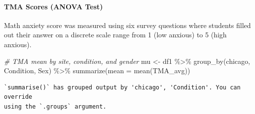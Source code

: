 \documentclass[
  letterpaper,
  DIV=11,
  numbers=noendperiod]{scrartcl}
\let\oldparagraph\paragraph
\renewcommand{\paragraph}[1]{\oldparagraph{#1}\mbox{}}
\newenvironment{Shaded}{\begin{snugshade}}{\end{snugshade}}
\newcommand{\AttributeTok}[1]{\textcolor[rgb]{0.49,0.56,0.16}{#1}}
\newcommand{\CommentTok}[1]{\textcolor[rgb]{0.38,0.63,0.69}{\textit{#1}}}
\newcommand{\FunctionTok}[1]{\textcolor[rgb]{0.02,0.16,0.49}{#1}}
\newcommand{\NormalTok}[1]{\textcolor[rgb]{0.00,0.44,0.13}{#1}}
\newcommand{\OtherTok}[1]{\textcolor[rgb]{0.00,0.44,0.13}{#1}}
\newcommand{\SpecialCharTok}[1]{\textcolor[rgb]{0.25,0.44,0.63}{#1}}
\begin{document}
\hypertarget{tma-scores-anova-test}{%
\paragraph{TMA Scores (ANOVA Test)}\label{tma-scores-anova-test}}

Math anxiety score was measured using six survey questions where
students filled out their answer on a discrete scale range from 1 (low
anxious) to 5 (high anxious).

\begin{Shaded}
\begin{Highlighting}[]
\CommentTok{\# TMA mean by site, condition, and gender}
\NormalTok{mu }\OtherTok{\textless{}{-}}\NormalTok{ df1 }\SpecialCharTok{\%\textgreater{}\%} \FunctionTok{group\_by}\NormalTok{(chicago, Condition, Sex) }\SpecialCharTok{\%\textgreater{}\%} \FunctionTok{summarize}\NormalTok{(}\AttributeTok{mean =} \FunctionTok{mean}\NormalTok{(TMA\_avg))}
\end{Highlighting}
\end{Shaded}

\begin{verbatim}
`summarise()` has grouped output by 'chicago', 'Condition'. You can override
using the `.groups` argument.
\end{verbatim}
\end{document}
